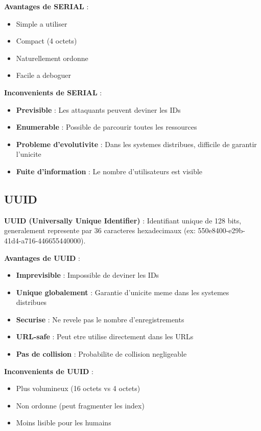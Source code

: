 \documentclass[a4paper,12pt]{book}
\begin{document}
\textbf{Avantages de SERIAL} :
\begin{itemize}
    \item Simple a utiliser
    \item Compact (4 octets)
    \item Naturellement ordonne
    \item Facile a deboguer
\end{itemize}

\textbf{Inconvenients de SERIAL} :
\begin{itemize}
    \item \textbf{Previsible} : Les attaquants peuvent deviner les IDs
    \item \textbf{Enumerable} : Possible de parcourir toutes les ressources
    \item \textbf{Probleme d'evolutivite} : Dans les systemes distribues, difficile de garantir l'unicite
    \item \textbf{Fuite d'information} : Le nombre d'utilisateurs est visible
\end{itemize}

\subsection{UUID}

\begin{definitionbox}
    \textbf{UUID (Universally Unique Identifier)} : Identifiant unique de 128 bits, generalement represente par 36 caracteres hexadecimaux (ex: 550e8400-e29b-41d4-a716-446655440000).
\end{definitionbox}

\textbf{Avantages de UUID} :
\begin{itemize}
    \item \textbf{Imprevisible} : Impossible de deviner les IDs
    \item \textbf{Unique globalement} : Garantie d'unicite meme dans les systemes distribues
    \item \textbf{Securise} : Ne revele pas le nombre d'enregistrements
    \item \textbf{URL-safe} : Peut etre utilise directement dans les URLs
    \item \textbf{Pas de collision} : Probabilite de collision negligeable
\end{itemize}

\textbf{Inconvenients de UUID} :
\begin{itemize}
    \item Plus volumineux (16 octets vs 4 octets)
    \item Non ordonne (peut fragmenter les index)
    \item Moins lisible pour les humains
\end{itemize}
\end{document}
